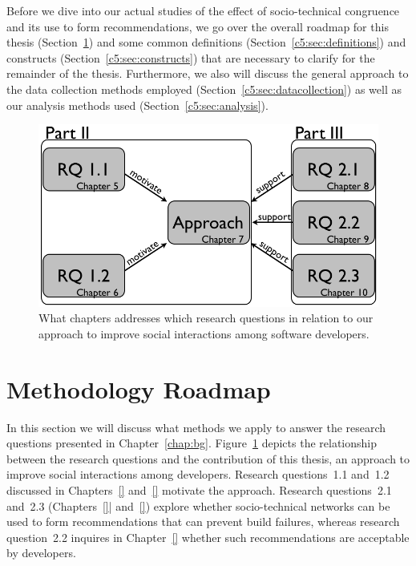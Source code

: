 \label{chap:meth}
Before we dive into our actual studies of the effect of socio-technical congruence and its use to form recommendations, we go over the overall roadmap for this thesis (Section~\ref{c5:sec:roadmap}) and some common definitions (Section~\ref{c5:sec:definitions}) and constructs (Section~\ref{c5:sec:constructs}) that are necessary to clarify for the remainder of the thesis.
Furthermore, we also will discuss the general approach to the data collection methods employed (Section~\ref{c5:sec:datacollection}) as well as our analysis methods used (Section~\ref{c5:sec:analysis}).

\begin{figure}[t]
\centering
\includegraphics[width=\columnwidth]{./figures/roadmap}
\caption{What chapters addresses which research questions in relation to our approach to improve social interactions among software developers.}
\label{fig:roadmap}
\end{figure}

\section{Methodology Roadmap}
\label{c5:sec:roadmap}
In this section we will discuss what methods we apply to answer the research questions presented in Chapter~\ref{chap:bg}.
Figure~\ref{fig:roadmap} depicts the relationship between the research questions and the contribution of this thesis, an approach to improve social interactions among developers.
Research questions~1.1 and~1.2 discussed in Chapters~\ref{} and~\ref{} motivate the approach.
Research questions~2.1 and~2.3 (Chapters~\ref{}| and~\ref{}) explore whether socio-technical networks can be used to form recommendations that can prevent build failures, whereas research question~2.2 inquires in Chapter~\ref{} whether such recommendations are acceptable by developers.

